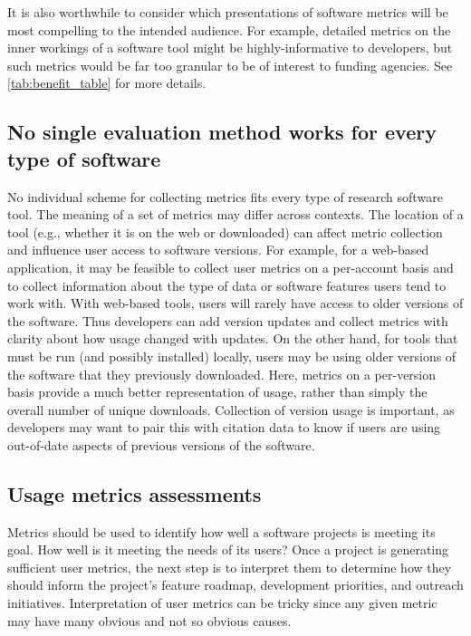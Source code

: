 \documentclass{article}
\begin{document}
It is also worthwhile to consider which presentations of software metrics will be most compelling to the intended audience. For example, detailed metrics on the inner workings of a software tool might be highly-informative to developers, but such metrics would be far too granular to be of interest to funding agencies.  See \ref{tab:benefit_table} for more details.
 


\subsection{No single evaluation method works for every type of software}
\label{sec:no_one_way}
No individual scheme for collecting metrics fits every type of research software tool.  The meaning of a set of metrics may differ across contexts. The location of a tool (e.g., whether it is on the web or downloaded) can affect metric collection and influence user access to software versions. For example, for a web-based application, it may be feasible to collect user metrics on a per-account basis and to collect information about the type of data or software features users tend to work with. With web-based tools, users will rarely have access to older versions of the software. Thus developers can add version updates and collect metrics with clarity about how usage changed with updates. On the other hand, for tools that must be run (and possibly installed)  locally, users may be using older versions of the software that they previously downloaded.  Here, metrics on a per-version basis provide a much better representation of usage, rather than simply the overall number of unique downloads. Collection of version usage is important, as developers may want to pair this with citation data to know if users are using out-of-date aspects of previous versions of the software.



 \subsection{Usage metrics assessments}
Metrics should be used to identify how well a software projects is meeting its goal. How well is it meeting the needs of its users? Once a project is generating sufficient user metrics, the next step is to interpret them to determine how they should inform the project's feature roadmap, development priorities, and outreach initiatives. Interpretation of user metrics can be tricky since any given metric may have many obvious and not so obvious causes. 
\end{document}

